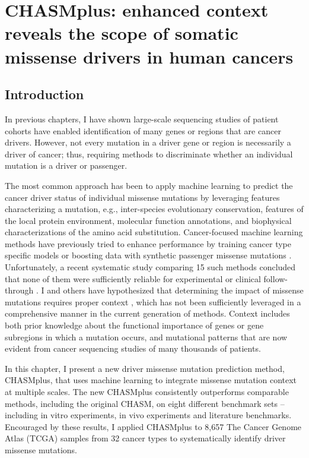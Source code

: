 
\chapter{CHASMplus: enhanced context reveals the scope of somatic missense drivers in human cancers}
\label{chap:ch6}

\section{Introduction}
In previous chapters, I have shown large-scale sequencing studies of patient cohorts have enabled identification of many genes or regions that are cancer drivers. However, not every mutation in a driver gene or region is necessarily a driver of cancer; thus, requiring methods to discriminate whether an individual mutation is a driver or passenger.

The most common approach has been to apply machine learning to predict the cancer driver status of individual missense mutations by leveraging features characterizing a mutation, e.g., inter-species evolutionary conservation, features of the local protein environment, molecular function annotations, and biophysical characterizations of the amino acid substitution. Cancer-focused machine learning methods have previously tried to enhance performance by training cancer type specific models \cite{RN36, RN29} or boosting data with synthetic passenger missense mutations \cite{RN29}.  Unfortunately, a recent systematic study comparing 15 such methods concluded that none of them were sufficiently reliable for experimental or clinical follow-through \cite{RN134, RN136}. I and others have hypothesized that determining the impact of missense mutations requires proper context \cite{RN47}, which has not been sufficiently leveraged in a comprehensive manner in the current generation of methods. Context includes both prior knowledge about the functional importance of genes or gene subregions in which a mutation occurs, and mutational patterns that are now evident from cancer sequencing studies of many thousands of patients.

In this chapter, I present a new driver missense mutation prediction method, CHASMplus, that uses machine learning to integrate missense mutation context at multiple scales. The new CHASMplus consistently outperforms comparable methods, including the original CHASM, on eight different benchmark sets -- including in vitro experiments, in vivo experiments and literature benchmarks. Encouraged by these results, I applied CHASMplus to 8,657 The Cancer Genome Atlas (TCGA) samples from 32 cancer types to systematically identify driver missense mutations.

